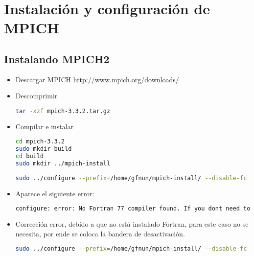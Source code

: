 \section{Instalación y configuración de MPICH}

\subsection{Instalando MPICH2}

\begin{itemize}


    \item Descargar MPICH \url{http://www.mpich.org/downloads/}
    

    \item Descomprimir
\begin{lstlisting}[language=bash,style=mystyle]     
tar -xzf mpich-3.3.2.tar.gz 
\end{lstlisting}   

    \item Compilar e instalar 
\begin{lstlisting}[language=bash,style=mystyle]    
cd mpich-3.3.2
sudo mkdir build
cd build
sudo mkdir ../mpich-install
  
sudo ../configure --prefix=/home/gfnun/mpich-install/ --disable-fc --disable-f77 --enable-shared
\end{lstlisting} 


\item Aparece el siguiente error:

\begin{lstlisting}[language=bash,style=mystyle2]  
configure: error: No Fortran 77 compiler found. If you dont need to build any Fortran programs, you can disable Fortran support using --disable-fortran. If you do want to build Fortran programs, you need to install a Fortran compiler such as gfortran or ifort before you can proceed.
\end{lstlisting} 



\item Corrección error, debido a que no está instalado Fortran, para este caso no se necesita, por ende se coloca la bandera de desactivación.

\begin{lstlisting}[language=bash,style=mystyle]    
sudo ../configure --prefix=/home/gfnun/mpich-install/ --disable-fc --disable-f77 --enable-shared --disable-fortran 
\end{lstlisting} 




\end{itemize}
